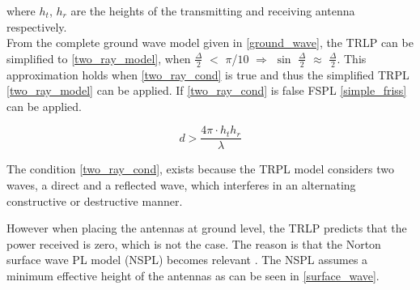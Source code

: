 where $h_t$, $h_r$ are the heights of the transmitting and receiving antenna respectively. \\
From the complete ground wave model given in \eqref{ground_wave}, the TRLP can be simplified to \eqref{two_ray_model}, when $\frac{\Delta}{2}$ $<$ $\pi$/$10$ $\Rightarrow$ $\sin$ $\frac{\Delta}{2}$ $\approx$ $\frac{\Delta}{2}$. This approximation holds when \eqref{two_ray_cond} is true and thus the simplified TRPL \eqref{two_ray_model} can be applied. If \eqref{two_ray_cond} is false FSPL \eqref{simple_friss} can be applied.
  
\begin{equation}
d > \frac{4\pi \cdot h_t h_r }{\lambda}
\label{two_ray_cond}
\end{equation}
 

The condition \eqref{two_ray_cond}, exists because the TRPL model considers two waves, a direct and a reflected wave, which interferes in an alternating constructive or destructive manner.










However when placing the antennas at ground level, the TRLP predicts that the power received is zero, which is not the case.
The reason is that the Norton surface wave PL model (NSPL) becomes relevant \cite{Chong}. The NSPL assumes a minimum effective height of the antennas as can be seen in \eqref{surface_wave}. 

